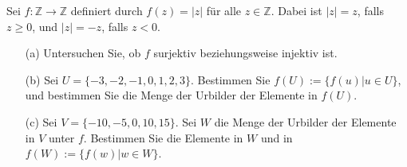 Sei \( f : \mathbb{Z} \to \mathbb{Z} \) definiert durch \( f(z) = |z| \) für alle \( z \in \mathbb{Z} \). Dabei ist \( |z| = z \), falls \( z \geq 0 \), und \( |z| = -z \), falls \( z < 0 \).

\begin{enumerate}
    \item[(a)] Untersuchen Sie, ob \( f \) surjektiv beziehungsweise injektiv ist.
    \item[(b)] Sei \( U = \{-3, -2, -1, 0, 1, 2, 3\} \). Bestimmen Sie \( f(U) := \{ f(u) | u \in U \} \), und bestimmen Sie die Menge der Urbilder der Elemente in \( f(U) \).
    \item[(c)] Sei \( V = \{-10, -5, 0, 10, 15\} \). Sei \( W \) die Menge der Urbilder der Elemente in \( V \) unter \( f \). Bestimmen Sie die Elemente in \( W \) und in \( f(W) := \{ f(w) | w \in W \} \).
\end{enumerate}